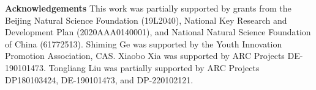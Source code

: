 \documentclass[10pt,twocolumn,letterpaper]{article}
\newcommand{\myPara}[1]{\vspace{.05in}\noindent\textbf{#1}}
\begin{document}
\small{\myPara{Acknowledgements}}
This work was partially supported by grants from the Beijing Natural Science Foundation (19L2040), National Key Research and Development Plan (2020AAA0140001), and National Natural Science Foundation of China (61772513). Shiming Ge was supported by the Youth Innovation Promotion Association, CAS. Xiaobo Xia was supported by ARC Projects DE-190101473. Tongliang Liu was partially supported by ARC Projects DP180103424, DE-190101473, and DP-220102121.

{\small


}
\end{document}
